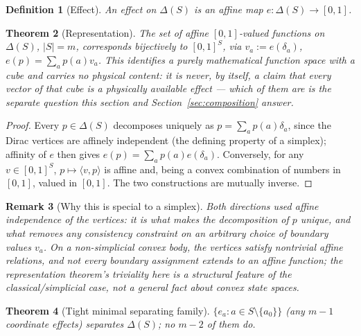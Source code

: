 \documentclass[11pt,a4paper]{article}
\newtheorem{theorem}{Theorem}[section]
\newtheorem{definition}[theorem]{Definition}
\newtheorem{remark}[theorem]{Remark}
\newcommand{\dd}{\delta}
\newcommand{\abs}[1]{\lvert #1 \rvert}
\begin{document}
    \begin{definition}[Effect]
      \label{def:effect}
      An effect on $\Delta(S)$ is an affine map $e \colon \Delta(S) \to [0,1]$.
    \end{definition}

    \begin{theorem}[Representation]
      \label{thm:ea1}
      The set of affine $[0,1]$-valued functions on $\Delta(S)$, $\abs{S} = m$, corresponds bijectively to
      $[0,1]^S$, via $v_a := e(\dd_a)$, $e(p) = \sum_a p(a) v_a$.
      This identifies a purely mathematical function space with a cube and carries no physical content: it
      is never, by itself, a claim that every vector of that cube is a physically available effect --- which
      of them are is the separate question this section and Section~\ref{sec:composition} answer.
    \end{theorem}

    \begin{proof}
      Every $p \in \Delta(S)$ decomposes uniquely as $p = \sum_a p(a) \dd_a$, since the Dirac vertices are
      affinely independent (the defining property of a simplex); affinity of $e$ then gives
      $e(p) = \sum_a p(a) e(\dd_a)$.
      Conversely, for any $v \in [0,1]^S$, $p \mapsto \langle v, p \rangle$ is affine and, being a convex
      combination of numbers in $[0,1]$, valued in $[0,1]$.
      The two constructions are mutually inverse.
    \end{proof}

    \begin{remark}[Why this is special to a simplex]
      \label{rem:ea1-simplex}
      Both directions used affine independence of the vertices: it is what makes the decomposition of $p$
      unique, and what removes any consistency constraint on an arbitrary choice of boundary values $v_a$.
      On a non-simplicial convex body, the vertices satisfy nontrivial affine relations, and not every
      boundary assignment extends to an affine function; the representation theorem's triviality here is a
      structural feature of the classical/simplicial case, not a general fact about convex state spaces.
    \end{remark}

    \begin{theorem}[Tight minimal separating family]
      \label{thm:ea2}
      $\{ e_a : a \in S \setminus \{a_0\} \}$ (any $m-1$ coordinate effects) separates $\Delta(S)$; no $m-2$
      of them do.
    \end{theorem}
\end{document}
